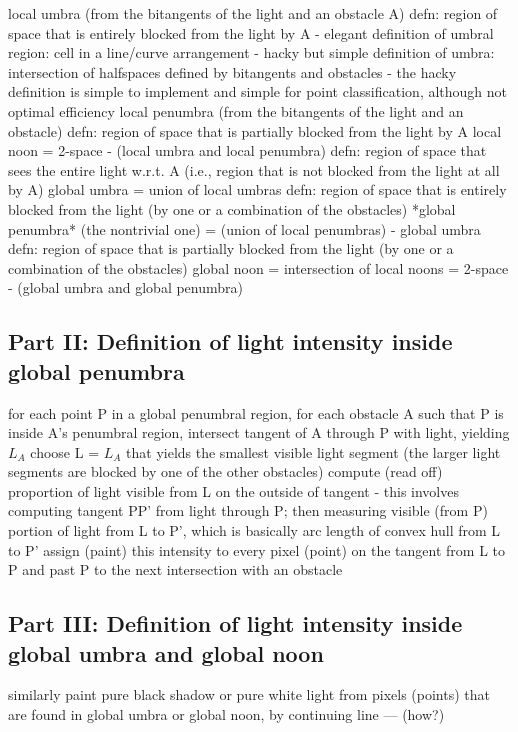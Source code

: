 \documentclass[12pt]{article}
\begin{document}
local umbra 
	(from the bitangents of the light and an obstacle A)
	defn: region of space that is entirely blocked from the light by A
	- elegant definition of umbral region: cell in a line/curve arrangement
	- hacky but simple definition of umbra: intersection of halfspaces defined
		by bitangents and obstacles
	- the hacky definition is simple to implement and simple for point 
		classification, although not optimal efficiency
local penumbra 
	(from the bitangents of the light and an obstacle)
	defn: region of space that is partially blocked from the light by A
local noon
	= 2-space - (local umbra and local penumbra)
	defn: region of space that sees the entire light w.r.t. A
		(i.e., region that is not blocked from the light at all by A)
global umbra 
	= union of local umbras
	defn: region of space that is entirely blocked from the light 
	      (by one or a combination of the obstacles)
*global penumbra*	(the nontrivial one)
	= (union of local penumbras) - global umbra
	defn: region of space that is partially blocked from the light 
	      (by one or a combination of the obstacles)
global noon
	= intersection of local noons
	= 2-space - (global umbra and global penumbra)
	
			
\subsection{Part II: Definition of light intensity inside global penumbra}

for each point P in a global penumbral region,
  for each obstacle A such that P is inside A's penumbral region,
	intersect tangent of A through P with light, yielding $L_A$
  choose L = $L_A$ that yields the smallest visible light segment
	(the larger light segments are blocked by one of the other obstacles)
  compute (read off) proportion of light visible from L on the
	outside of tangent
	   - this involves computing tangent PP' from light 
	     through P; then measuring visible (from P) portion of 
	     light from L to P', which is basically arc length
	     of convex hull from L to P'
  assign (paint) this intensity to every pixel (point) on 
	     the tangent from L to P and past P to the next 
	     intersection with an obstacle

			
\subsection{Part III: Definition of light intensity inside global umbra and global noon}

similarly paint pure black shadow or pure white light
     from pixels (points) that are found in global umbra
     or global noon, by continuing line --- (how?)

			
\end{document}
